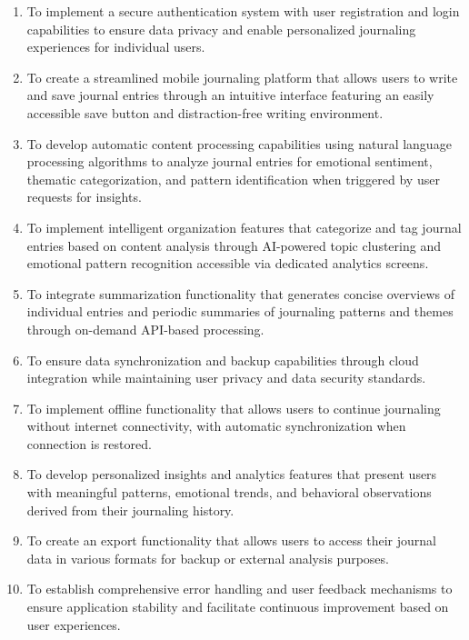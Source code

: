 \begin{enumerate}
	\item To implement a secure authentication system with user registration and login capabilities to ensure data privacy and enable personalized journaling experiences for individual users.
	
	\item To create a streamlined mobile journaling platform that allows users to write and save journal entries through an intuitive interface featuring an easily accessible save button and distraction-free writing environment.
	
	\item To develop automatic content processing capabilities using natural language processing algorithms to analyze journal entries for emotional sentiment, thematic categorization, and pattern identification when triggered by user requests for insights.
	
	\item To implement intelligent organization features that categorize and tag journal entries based on content analysis through AI-powered topic clustering and emotional pattern recognition accessible via dedicated analytics screens.
	
	\item To integrate summarization functionality that generates concise overviews of individual entries and periodic summaries of journaling patterns and themes through on-demand API-based processing.
	
	\item To ensure data synchronization and backup capabilities through cloud integration while maintaining user privacy and data security standards.
	
	\item To implement offline functionality that allows users to continue journaling without internet connectivity, with automatic synchronization when connection is restored.
	
	\item To develop personalized insights and analytics features that present users with meaningful patterns, emotional trends, and behavioral observations derived from their journaling history.
	
	\item To create an export functionality that allows users to access their journal data in various formats for backup or external analysis purposes.
	
	\item To establish comprehensive error handling and user feedback mechanisms to ensure application stability and facilitate continuous improvement based on user experiences.
\end{enumerate}

